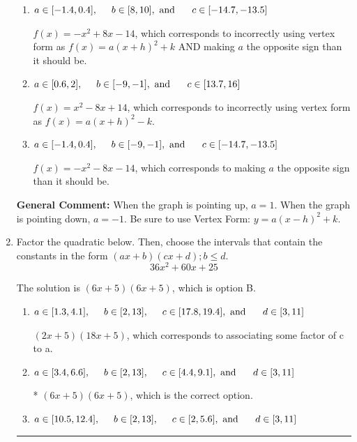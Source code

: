 \documentclass{extbook}[14pt]
\newcommand{\litem}[1]{\item #1

\rule{\textwidth}{0.4pt}}
\begin{document}
\begin{enumerate}
{\begin{enumerate}[label=\Alph*.]
$f(x)=x^{2} -8 x + 18$, which corresponds to incorrectly using vertex form as $f(x) = a(x+h)^2+k$.
\item \( a \in [-1.4, 0.4], \hspace*{5mm} b \in [8, 10], \text{ and } \hspace*{5mm} c \in [-14.7, -13.5] \)

$f(x)=-x^{2} +8 x -14$, which corresponds to incorrectly using vertex form as $f(x) = a(x+h)^2+k$ AND making $a$ the opposite sign than it should be.
\item \( a \in [0.6, 2], \hspace*{5mm} b \in [-9, -1], \text{ and } \hspace*{5mm} c \in [13.7, 16] \)

$f(x)=x^{2} -8 x + 14$, which corresponds to incorrectly using vertex form as $f(x) = a(x+h)^2 - k$.
\item \( a \in [-1.4, 0.4], \hspace*{5mm} b \in [-9, -1], \text{ and } \hspace*{5mm} c \in [-14.7, -13.5] \)

$f(x)=-x^{2} -8 x -14$, which corresponds to making $a$ the opposite sign than it should be.
\end{enumerate}

\textbf{General Comment:} When the graph is pointing up, $a=1$. When the graph is pointing down, $a=-1$. Be sure to use Vertex Form: $y = a(x-h)^2+k$.
}
\litem{
Factor the quadratic below. Then, choose the intervals that contain the constants in the form $(ax+b)(cx+d); b \leq d.$
\[ 36x^{2} +60 x + 25 \]

The solution is \( (6x + 5)(6x + 5) \), which is option B.\begin{enumerate}[label=\Alph*.]
\item \( a \in [1.3, 4.1], \hspace*{5mm} b \in [2, 13], \hspace*{5mm} c \in [17.8, 19.4], \text{ and } \hspace*{5mm} d \in [3, 11] \)

 $(2x + 5)(18x + 5)$, which corresponds to associating some factor of c to a.
\item \( a \in [3.4, 6.6], \hspace*{5mm} b \in [2, 13], \hspace*{5mm} c \in [4.4, 9.1], \text{ and } \hspace*{5mm} d \in [3, 11] \)

* $(6x + 5)(6x + 5)$, which is the correct option.
\item \( a \in [10.5, 12.4], \hspace*{5mm} b \in [2, 13], \hspace*{5mm} c \in [2, 5.6], \text{ and } \hspace*{5mm} d \in [3, 11] \)


\end{enumerate}}
\end{enumerate}
\end{document}
